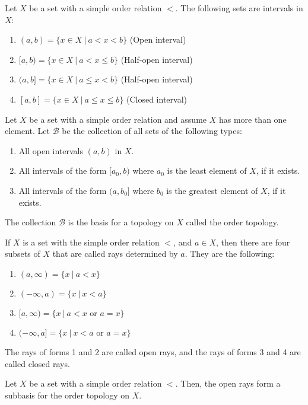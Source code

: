 \documentclass{article}
\newcommand{\B}{\mathcal B}
\begin{document}
    Let $X$ be a set with a simple order relation $<$. The following sets are intervals in $X$:
    \begin{enumerate}
        \item $(a,b) = \{x \in X ~|~ a < x < b\}$ (Open interval)
        \item $[a,b) = \{x \in X ~|~ a < x \leq b\}$ (Half-open interval)
        \item $(a,b] = \{x \in X ~|~ a \leq x < b\}$ (Half-open interval)
        \item $[a,b] = \{x \in X ~|~ a \leq x \leq b\}$ (Closed interval)
    \end{enumerate}

\medskip{}

    Let $X$ be a set with a simple order relation and assume $X$ has more than one element. Let $\B$ be the collection of all sets of the following types:
    \begin{enumerate}
        \item All open intervals $(a,b)$ in $X$.
        \item All intervals of the form $[a_0,b)$ where $a_0$ is the least element of $X$, if it exists.
        \item All intervals of the form $(a,b_0]$ where $b_0$ is the greatest element of $X$, if it exists.
    \end{enumerate}

    The collection $\B$ is the basis for a topology on $X$ called the order topology.

\medskip{}

    If $X$ is a set with the simple order relation $<$, and $a \in X$, then there are four subsets of $X$ that are called rays determined by $a$. They are the following:
    \begin{enumerate}
        \item $(a, \infty) = \{x ~|~ a < x\}$
        \item $(-\infty, a) = \{x ~|~ x < a\}$
        \item $[a, \infty) = \{x ~|~ a < x \text{ or } a = x\}$
        \item $(-\infty, a] = \{x ~|~ x < a \text{ or } a = x\}$
    \end{enumerate}
    The rays of forms 1 and 2 are called open rays, and the rays of forms 3 and 4 are called closed rays.

\medskip{}

    Let $X$ be a set with a simple order relation $<$. Then, the open rays form a subbasis for the order topology on $X$.
\end{document}

